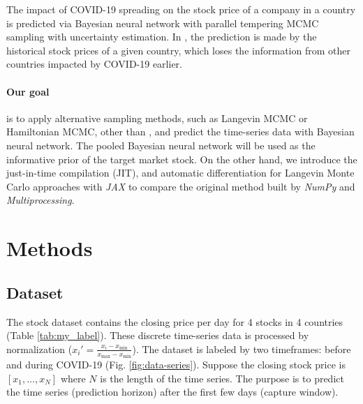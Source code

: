 \documentclass{article}
\begin{document}
The impact of COVID-19 spreading on the stock price of a company in a country is predicted via Bayesian neural network with parallel tempering MCMC sampling\citep{chandra2021bayesian, chandra2019langevin} with uncertainty estimation. In \cite{chandra2021bayesian}, the prediction is made by the historical stock prices of a given country, which loses the information from other countries impacted by COVID-19 earlier. 

\paragraph{Our goal} is to apply alternative sampling methods, such as Langevin MCMC or Hamiltonian MCMC, other than \citep{chandra2019langevin}, and predict the time-series data with Bayesian neural network. The pooled Bayesian neural network will be used as the informative prior of the target market stock. On the other hand, we introduce the just-in-time compilation (JIT), and automatic differentiation for Langevin Monte Carlo approaches with \textit{JAX}\citep{jax2018github} to compare the original method built by \textit{NumPy} and \textit{Multiprocessing}\citep{chandra2021bayesian}. %



\section{Methods}


\subsection{Dataset}

The stock dataset contains the closing price per day for 4 stocks in 4 countries (Table \ref{tab:my_label}). These discrete time-series data is processed by normalization ($x_{i}' = \frac{x_{i} - x_{\min}}{x_{\max} - x_{\min}}$). The dataset is labeled by two timeframes: before and during COVID-19 (Fig. \ref{fig:data-series}). Suppose the closing stock price is $[x_1, \dots, x_N]$ where $N$ is the length of the time series. The purpose is to predict the time series (prediction horizon) after the first few days (capture window).
\end{document}
